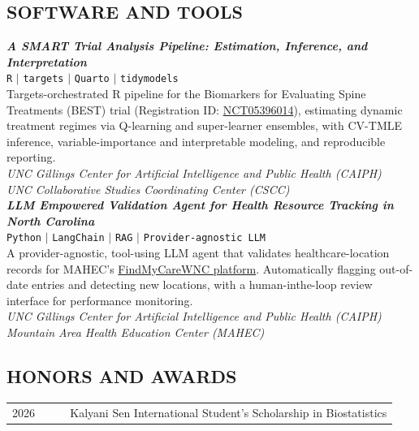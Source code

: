 \documentclass[11pt]{scrartcl}
\begin{document}
\subsection{\MakeUppercase{Software and Tools}}\label{software}
\noindent
{\def\arraystretch{1.2}

\textit{\textbf{A SMART Trial Analysis Pipeline: Estimation,  Inference, and Interpretation}} \\
\texttt{R} $\mid$ \texttt{targets} $\mid$ \texttt{Quarto} $\mid$ \texttt{tidymodels}\\
{
Targets-orchestrated R pipeline for the Biomarkers for Evaluating Spine Treatments (BEST) trial (Registration ID: \href{https://clinicaltrials.gov/study/NCT05396014}{NCT05396014}), estimating dynamic treatment regimes via Q-learning and super-learner ensembles, with CV-TMLE inference, variable-importance and interpretable modeling, and reproducible reporting.
}\\[0.3em]
\emph{
UNC Gillings Center for Artificial Intelligence and Public Health (CAIPH)\\
UNC Collaborative Studies Coordinating Center (CSCC)}\\


\textit{\textbf{LLM Empowered Validation Agent for Health Resource Tracking in North Carolina}} \\
\texttt{Python} $\mid$ \texttt{LangChain} $\mid$ \texttt{RAG} $\mid$ \texttt{Provider-agnostic LLM} \\
{
A provider-agnostic, tool-using LLM agent that validates healthcare-location records for MAHEC's \href{https://mahec.net/regional-initiatives/itacc-resource-map}{FindMy\-CareWNC platform}. Automatically flagging out-of-date entries and detecting new locations, with a human-in\-the-loop review interface for performance monitoring.
}\\[0.3em]
\emph{
UNC Gillings Center for Artificial Intelligence and Public Health (CAIPH)\\ 
Mountain Area Health Education Center (MAHEC)
}

\subsection{\MakeUppercase{Honors and
Awards}}\label{honours-and-awards}
\noindent
{\def\arraystretch{1.2}\tabcolsep=0pt
\begin{longtable}{p{0.15\linewidth}p{0.85\linewidth}}

  2026 & Kalyani Sen International Student's Scholarship in Biostatistics \\
  

\end{longtable}}}
\end{document}
